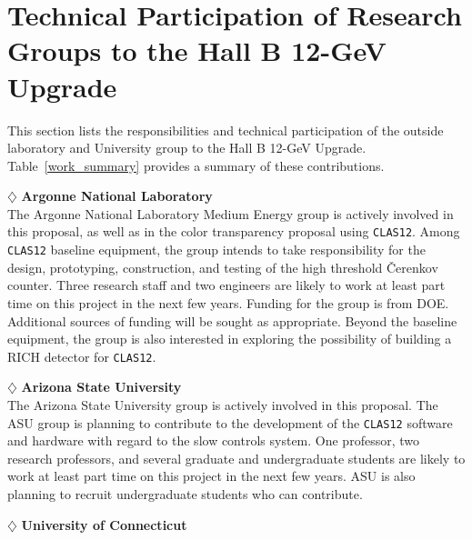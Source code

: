 \section{Technical Participation of Research Groups to the Hall B 12-GeV 
Upgrade}

This section lists the responsibilities and technical participation of
the outside laboratory and University group to the Hall B 12-GeV Upgrade.
Table~\ref{work_summary} provides a summary of these contributions.

\vskip 0.4cm

\noindent
$\diamondsuit$ {\bf Argonne National Laboratory} \\[0.2ex]

\noindent
The Argonne National Laboratory Medium Energy group is actively involved 
in this proposal, as well as in the color transparency proposal using 
{\tt CLAS12}.  Among {\tt CLAS12} baseline equipment, the group intends to 
take responsibility for the design, prototyping, construction, and testing 
of the high threshold {\v C}erenkov counter.  Three research staff and two 
engineers are likely to work at least part time on this project in the next 
few years.  Funding for the group is from DOE. Additional sources of funding 
will be sought as appropriate.  Beyond the baseline equipment, the group is 
also interested in exploring the possibility of building a RICH detector for 
{\tt CLAS12}.

\vskip 0.4cm

\noindent
$\diamondsuit$ {\bf Arizona State University} \\[0.2ex]

\noindent
The Arizona State University group is actively involved in this proposal.
The ASU group is planning to contribute to the development of the {\tt CLAS12} 
software and hardware with regard to the slow controls system.  One professor,
two research professors, and several graduate and undergraduate students are
likely to work at least part time on this project in the next few years.
ASU is also planning to recruit undergraduate students who can contribute.

\vskip 0.4cm

\noindent
$\diamondsuit$ {\bf University of Connecticut} \\[0.2ex]

